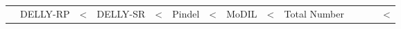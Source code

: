 \begin{table}[t]
\begin{center}
\begin{tabular}{r|rrrr|rrrrr}
&  DELLY-RP           & <%
&  DELLY-SR           & <%
&  Pindel           & <%
&  MoDIL           & <%
   \hline
{} & Total Number &          &           & & <%

\end{tabular}
\end{center}
\end{table}
